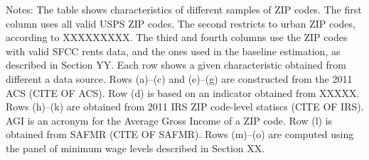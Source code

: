 \begin{table}[hbt!]
    \begin{minipage}{.95\textwidth} \footnotesize
        \vspace{2mm}
        Notes: The table shows characteristics of different samples of ZIP codes.
        The first column uses all valid USPS ZIP codes.
        The second restricts to urban ZIP codes, according to XXXXXXXXX.
        The third and fourth columns use the ZIP codes with valid SFCC rents 
        data, and the ones used in the baseline estimation, as described in
        Section YY.
        Each row shows a given characteristic obtained from different a data 
        source.
        Rows (a)--(c) and (e)--(g) are constructed from the 2011 ACS (CITE OF ACS).
        Row (d) is based on an indicator obtained from XXXXX.
        Rows (h)--(k) are obtained from 2011 IRS ZIP code-level statiscs (CITE OF IRS).
        AGI is an acronym for the Average Gross Income of a ZIP code.
        Row (l) is obtained from SAFMR (CITE OF SAFMR).
        Rows (m)--(o) are computed using the panel of minimum wage levels 
        described in Section XX.
    \end{minipage}
\end{table}
